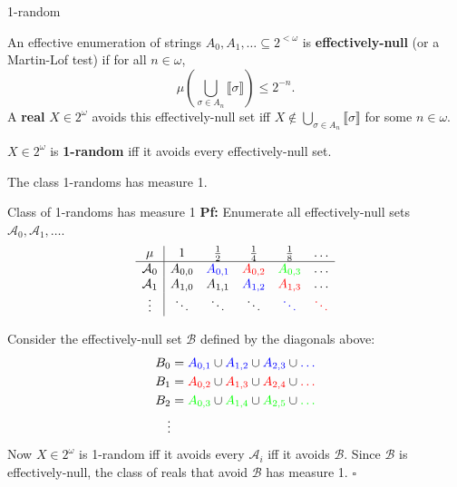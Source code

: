 \begin{frame}{1-random}
  \begin{define*}
    An effective enumeration of strings
    $A_0,A_1,\ldots \subseteq 2^{<\omega}$ is \textbf{effectively-null} (or a
    Martin-Lof test) if for all $n\in\omega$,
    \[\mu\left(\bigcup_{\sigma \in A_n} \llbracket\sigma\rrbracket \right)
    \leq 2^{-n}.\]
    A \textbf{real} $X\in2^\omega$ avoids this effectively-null set iff
    $X\not\in \bigcup_{\sigma \in A_n} \llbracket\sigma\rrbracket$ for some
    $n\in\omega$.
  \end{define*}

  \begin{define*}
    $X\in2^\omega$ is \textbf{1-random} iff it avoids every
    effectively-null set.
  \end{define*}

  \begin{thm*}
    The class 1-randoms has measure 1.
  \end{thm*}
\end{frame}

\begin{frame}{Class of 1-randoms has measure 1}
  \textbf{Pf:} Enumerate all effectively-null sets
  $\mathcal{A}_0,\mathcal{A}_1,\ldots$.
  \[\begin{array}{c|ccccc}
    \mu &1 &\frac{1}{2} &\frac{1}{4} &\frac{1}{8} &\ldots\\
    \hline
    \mathcal{A}_0 &A_{0,0} &\textcolor{blue}{A_{0,1}}
    &\textcolor{red}{A_{0,2}} &\textcolor{green}{A_{0,3}} &\ldots\\
    \mathcal{A}_1 &A_{1,0} &A_{1,1} &\textcolor{blue}{A_{1,2}}
    &\textcolor{red}{A_{1,3}} &\ldots\\
    \vdots &\ddots &\ddots &\ddots
    &\textcolor{blue}{\ddots} &\textcolor{red}{\ddots}
  \end{array}\]

  Consider the effectively-null set $\mathcal{B}$ defined by the diagonals
  above:
  \begin{align*}
    B_0&= \textcolor{blue}{A_{0,1}} \cup \textcolor{blue}{A_{1,2}} \cup
    \textcolor{blue}{A_{2,3}} \cup \textcolor{blue}{\ldots}\\
    B_1&= \textcolor{red}{A_{0,2}} \cup \textcolor{red}{A_{1,3}} \cup
    \textcolor{red}{A_{2,4}} \cup \textcolor{red}{\ldots}\\
    B_2&= \textcolor{green}{A_{0,3}} \cup \textcolor{green}{A_{1,4}} \cup
    \textcolor{green}{A_{2,5}} \cup \textcolor{green}{\ldots}\\
    \vdots&
  \end{align*}
  Now $X\in2^\omega$ is 1-random iff it avoids every $\mathcal{A}_i$ iff
  it avoids $\mathcal{B}$. Since $\mathcal{B}$ is effectively-null, the
  class of reals that avoid $\mathcal{B}$ has measure 1. $\square$
\end{frame}

